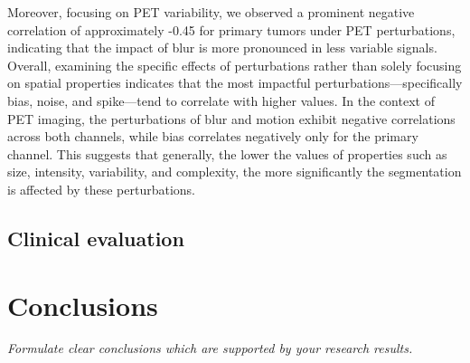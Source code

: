 Moreover, focusing on PET variability, we observed a prominent negative correlation of approximately -0.45 for primary tumors under PET perturbations, indicating that the impact of blur is more pronounced in less variable signals. Overall, examining the specific effects of perturbations rather than solely focusing on spatial properties indicates that the most impactful perturbations—specifically bias, noise, and spike—tend to correlate with higher values. In the context of PET imaging, the perturbations of blur and motion exhibit negative correlations across both channels, while bias correlates negatively only for the primary channel. This suggests that generally, the lower the values of properties such as size, intensity, variability, and complexity, the more significantly the segmentation is affected by these perturbations.

\newpage
\subsection{Clinical evaluation}

\section{Conclusions}

\textit{Formulate clear conclusions which are supported by your research results.}

\endinput